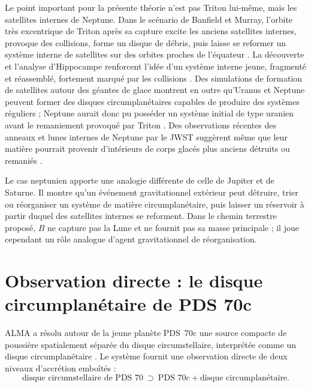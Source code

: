 \documentclass[11pt,a4paper,openany]{report}
\begin{document}
Le point important pour la présente théorie n'est pas Triton lui-même, mais les satellites
internes de Neptune. Dans le scénario de Banfield et Murray, l'orbite très excentrique de Triton
après sa capture excite les anciens satellites internes, provoque des collisions, forme un disque
de débris, puis laisse se reformer un système interne de satellites sur des orbites proches de
l'équateur \cite{BanfieldMurray1992}. La découverte et l'analyse d'Hippocampe renforcent l'idée
d'un système interne jeune, fragmenté et réassemblé, fortement marqué par les collisions
\cite{Showalter2019}. Des simulations de formation de satellites autour des géantes de glace
montrent en outre qu'Uranus et Neptune peuvent former des disques circumplanétaires capables de
produire des systèmes réguliers ; Neptune aurait donc pu posséder un système initial de type
uranien avant le remaniement provoqué par Triton \cite{Szulagyi2018}. Des observations récentes
des anneaux et lunes internes de Neptune par le JWST suggèrent même que leur matière pourrait
provenir d'intérieurs de corps glacés plus anciens détruits ou remaniés \cite{Davis2026}.

\begin{ideephys}
Le cas neptunien apporte une analogie différente de celle de Jupiter et de Saturne. Il montre
qu'un événement gravitationnel extérieur peut détruire, trier ou réorganiser un système de
matière circumplanétaire, puis laisser un réservoir à partir duquel des satellites internes se
reforment. Dans le chemin terrestre proposé, $B$ ne capture pas la Lune et ne fournit pas sa masse
principale ; il joue cependant un rôle analogue d'agent gravitationnel de réorganisation.
\end{ideephys}

\section{Observation directe : le disque circumplanétaire de PDS 70c}

ALMA a résolu autour de la jeune planète PDS~70c une source compacte de poussière
spatialement séparée du disque circumstellaire, interprétée comme un disque circumplanétaire
\cite{Benisty2021}. Le système fournit une observation directe de deux niveaux d'accrétion
emboîtés :
\begin{equation}
\text{disque circumstellaire de PDS~70}\ \supset\ \text{PDS~70c}+\text{disque circumplanétaire}.
\label{eq:pds70}
\end{equation}
\end{document}

